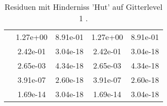 \begin{table}
\begin{tabular}{c|cc|cc|}
\multicolumn{1}{|c|}{} & \multicolumn{1}{|c|}{  1.27e+00} & \multicolumn{1}{|c|}{  8.91e-01} & \multicolumn{1}{|c|}{  1.27e+00} & \multicolumn{1}{|c|}{  8.91e-01} \\ 
\multicolumn{1}{|c|}{} & \multicolumn{1}{|c|}{  2.42e-01} & \multicolumn{1}{|c|}{  3.04e-18} & \multicolumn{1}{|c|}{  2.42e-01} & \multicolumn{1}{|c|}{  3.04e-18} \\ 
\multicolumn{1}{|c|}{} & \multicolumn{1}{|c|}{  2.65e-03} & \multicolumn{1}{|c|}{  4.34e-18} & \multicolumn{1}{|c|}{  2.65e-03} & \multicolumn{1}{|c|}{  4.34e-18} \\ 
\multicolumn{1}{|c|}{} & \multicolumn{1}{|c|}{  3.91e-07} & \multicolumn{1}{|c|}{  2.60e-18} & \multicolumn{1}{|c|}{  3.91e-07} & \multicolumn{1}{|c|}{  2.60e-18} \\ 
\multicolumn{1}{|c|}{} & \multicolumn{1}{|c|}{  1.69e-14} & \multicolumn{1}{|c|}{  3.04e-18} & \multicolumn{1}{|c|}{  1.69e-14} & \multicolumn{1}{|c|}{  3.04e-18} \\ 
\hline 
\end{tabular}\caption{Residuen mit Hinderniss 'Hut' auf Gitterlevel 1 .}\label{tab:Residuum_Hut_level1}
\end{table} 
